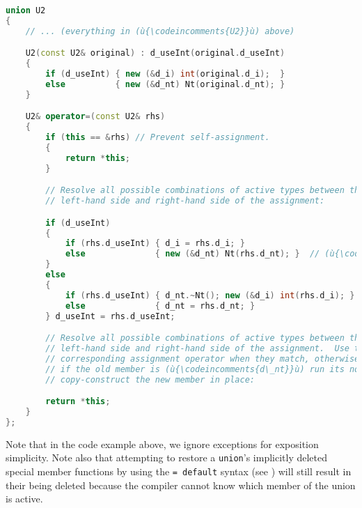 %
%
%
%
%
\begin{lstlisting}[language=C++]
union U2
{
    // ... (everything in (ù{\codeincomments{U2}}ù) above)

    U2(const U2& original) : d_useInt(original.d_useInt)
    {
        if (d_useInt) { new (&d_i) int(original.d_i);  }
        else          { new (&d_nt) Nt(original.d_nt); }
    }

    U2& operator=(const U2& rhs)
    {
        if (this == &rhs) // Prevent self-assignment.
        {
            return *this;
        }

        // Resolve all possible combinations of active types between the 
        // left-hand side and right-hand side of the assignment:

        if (d_useInt)
        {
            if (rhs.d_useInt) { d_i = rhs.d_i; }
            else              { new (&d_nt) Nt(rhs.d_nt); }  // (ù{\codeincomments{int}}ù) DTOR trivial
        }
        else
        {
            if (rhs.d_useInt) { d_nt.~Nt(); new (&d_i) int(rhs.d_i); }
            else              { d_nt = rhs.d_nt; }
        } d_useInt = rhs.d_useInt;

        // Resolve all possible combinations of active types between the
        // left-hand side and right-hand side of the assignment.  Use the
        // corresponding assignment operator when they match, otherwise
        // if the old member is (ù{\codeincomments{d\_nt}}ù) run its non-trivial destructor, then
        // copy-construct the new member in place:

        return *this;
    }
};
\end{lstlisting}
Note that in the code example above, we ignore exceptions for exposition simplicity. Note also that attempting to
restore a \lstinline!union!'s implicitly deleted special member
functions by using the \lstinline!=!~\lstinline!default! syntax (see
) will still result in their being deleted because
the compiler cannot know which member of the union is active.    

